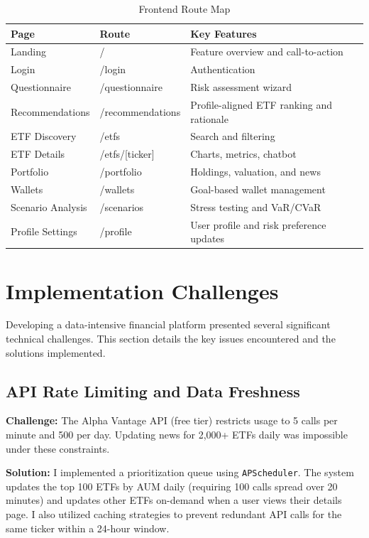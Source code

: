 \begin{table}[H]
\centering
\label{tab:frontend_routes}
\begin{tabular}{lll}
\toprule
\textbf{Page} & \textbf{Route} & \textbf{Key Features} \\
\midrule
Landing & / & Feature overview and call-to-action \\
Login & /login & Authentication \\
Questionnaire & /questionnaire & Risk assessment wizard \\
Recommendations & /recommendations & Profile-aligned ETF ranking and rationale \\
ETF Discovery & /etfs & Search and filtering \\
ETF Details & /etfs/[ticker] & Charts, metrics, chatbot \\
Portfolio & /portfolio & Holdings, valuation, and news \\
Wallets & /wallets & Goal-based wallet management \\
Scenario Analysis & /scenarios & Stress testing and VaR/CVaR \\
Profile Settings & /profile & User profile and risk preference updates \\
\bottomrule
\end{tabular}
\caption{Frontend Route Map}
\end{table}


\section{Implementation Challenges}

Developing a data-intensive financial platform presented several significant technical challenges. This section details the key issues encountered and the solutions implemented.

\subsection{API Rate Limiting and Data Freshness}
\textbf{Challenge:} The Alpha Vantage API (free tier) restricts usage to 5 calls per minute and 500 per day. Updating news for 2,000+ ETFs daily was impossible under these constraints.

\textbf{Solution:} I implemented a prioritization queue using \texttt{APScheduler}. The system updates the top 100 ETFs by AUM daily (requiring 100 calls spread over 20 minutes) and updates other ETFs on-demand when a user views their details page. I also utilized caching strategies to prevent redundant API calls for the same ticker within a 24-hour window.

